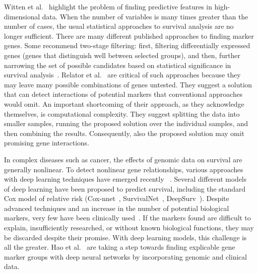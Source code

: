 \documentclass[11pt,a4paper]{article}
\begin{document}
Witten et al.~\cite{witten2010survival} highlight the problem of finding predictive features in high-dimensional data. When the number of variables is many times greater than the number of cases, the usual statistical approaches to survival analysis are no longer sufficient. There are many different published approaches to finding marker genes. Some recommend two-stage filtering: first, filtering differentially expressed genes (genes that distinguish well between selected groups), and then, further narrowing the set of possible candidates based on statistical significance in survival analysis~\cite{wang2017identification,liao2018identification,zhang2011discovery,kim2013identification}. Relator et al.~\cite{relator2018identifying} are critical of such approaches because they may leave many possible combinations of genes untested. They suggest a solution that can detect interactions of potential markers that conventional approaches would omit. An important shortcoming of their approach, as they acknowledge themselves, is computational complexity. They suggest splitting the data into smaller samples, running the proposed solution over the individual samples, and then combining the results. Consequently, also the proposed solution may omit promising gene interactions.

In complex diseases such as cancer, the effects of genomic data on survival are generally nonlinear. To detect nonlinear gene relationships, various approaches with deep learning techniques have emerged recently ~\cite{hao2019interpretable}. Several different models of deep learning have been proposed to predict survival, including the standard Cox model of relative risk (Cox-nnet~\cite{ching2018cox}, SurvivalNet~\cite {yousefi2017predicting}, DeepSurv~\cite{katzman2018deepsurv}). Despite advanced techniques and an increase in the number of potential biological markers, very few have been clinically used~\cite{burke2016predicting}. If the markers found are difficult to explain, insufficiently researched, or without known biological functions, they may be discarded despite their promise. With deep learning models, this challenge is all the greater. Hao et al.~\cite{hao2019interpretable} are taking a step towards finding explicable gene marker groups with deep neural networks by incorporating genomic and clinical data.
\end{document}
